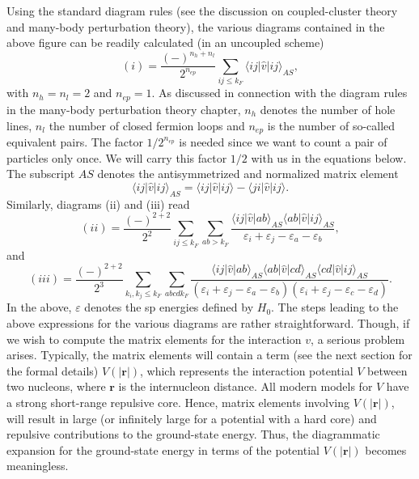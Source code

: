 \documentclass[%
oneside,                 %
final,                   %
10pt]{article}
\begin{document}
Using the standard diagram rules (see the discussion on coupled-cluster theory and many-body perturbation theory), the various
diagrams contained in the above figure can be readily calculated (in an uncoupled scheme)
\begin{equation}
   (i)=\frac{(-)^{n_h+n_l}}{2^{n_{ep}}}\sum_{ij\leq k_F}
       \langle ij\vert\hat{v}\vert ij\rangle_{AS},
\end{equation}
with $n_h=n_l=2$ and $n_{ep}=1$. As discussed  in connection with the diagram rules in the many-body perturbation theory chapter, $n_h$
denotes the number of hole lines, $n_l$ the number of closed
fermion loops and $n_{ep}$ is the number of so-called
equivalent pairs.
The factor $1/2^{n_{ep}}$ is needed since we want to count a pair 
of particles only once. We will carry this factor $1/2$ with us
in the equations below. 
The subscript $AS$ denotes the antisymmetrized and normalized matrix element
\begin{equation}
     \langle ij\vert\hat{v}\vert ij\rangle_{AS}=\langle ij \vert\hat{v}\vert ij\rangle-
     \langle ji \vert\hat{v}\vert ij\rangle.
\end{equation}
Similarly, diagrams (ii) and (iii) read
\begin{equation}
   (ii)=\frac{(-)^{2+2}}{2^2}\sum_{ij\leq k_F}\sum_{ab>k_F}
   \frac{\langle ij\vert\hat{v}\vert ab\rangle_{AS}
   \langle ab\vert\hat{v}\vert ij\rangle_{AS}}
   {\varepsilon_i+\varepsilon_j-\varepsilon_a-\varepsilon_b},
\end{equation}
and
\begin{equation}
   (iii)=\frac{(-)^{2+2}}{2^3}\sum_{k_i,k_j\leq k_F}\sum_{abcdk_F}
   \frac{\langle ij\vert\hat{v}\vert ab\rangle_{AS}
   \langle ab\vert\hat{v}\vert cd\rangle_{AS}
   \langle cd\vert\hat{v}\vert ij\rangle_{AS}}
   {(\varepsilon_i+\varepsilon_j-\varepsilon_a-\varepsilon_b)
   (\varepsilon_i+\varepsilon_j-\varepsilon_c-\varepsilon_d)}.
\end{equation}
In the above, $\varepsilon$ denotes the sp energies defined by
$H_0$.
The steps leading to the above expressions for the various
diagrams are rather straightforward. Though, if we wish to compute the
matrix elements for the interaction $v$, a serious problem
arises. Typically, the matrix elements will contain a term
(see the next section for the formal details) $V(|{\mathbf r}|)$, which
represents the interaction potential $V$ between two nucleons, where
${\mathbf r}$ is the internucleon distance.
All modern models
for $V$ have a strong short-range repulsive core. Hence,
matrix elements involving $V(|{\mathbf r}|)$, will result in large
(or infinitely large for a potential with a hard core)
and repulsive contributions to the ground-state energy. Thus, the
diagrammatic expansion for the ground-state energy in terms of the
potential $V(|{\mathbf r}|)$ becomes meaningless.
\end{document}
